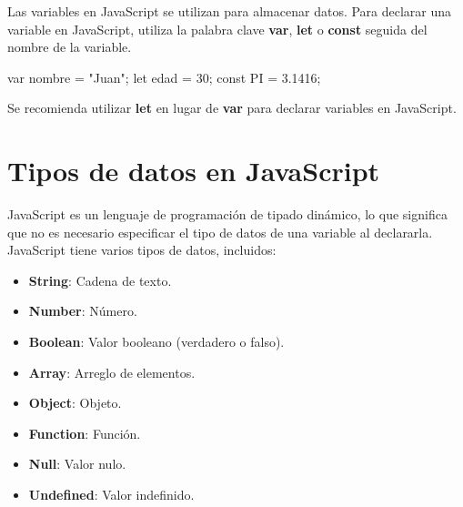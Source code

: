 \documentclass[
  a4paper,
  DIV=11,
  numbers=noendperiod,
  onepage,
  openany]{scrreprt}
\newenvironment{Shaded}{\begin{snugshade}}{\end{snugshade}}
\newcommand{\ConstantTok}[1]{\textcolor[rgb]{0.56,0.35,0.01}{#1}}
\newcommand{\DecValTok}[1]{\textcolor[rgb]{0.68,0.00,0.00}{#1}}
\newcommand{\FloatTok}[1]{\textcolor[rgb]{0.68,0.00,0.00}{#1}}
\newcommand{\KeywordTok}[1]{\textcolor[rgb]{0.00,0.23,0.31}{#1}}
\newcommand{\NormalTok}[1]{\textcolor[rgb]{0.00,0.23,0.31}{#1}}
\newcommand{\OperatorTok}[1]{\textcolor[rgb]{0.37,0.37,0.37}{#1}}
\newcommand{\StringTok}[1]{\textcolor[rgb]{0.13,0.47,0.30}{#1}}
\providecommand{\tightlist}{%
  \setlength{\itemsep}{0pt}\setlength{\parskip}{0pt}}\usepackage{longtable,booktabs,array}
\begin{document}
Las variables en JavaScript se utilizan para almacenar datos. Para
declarar una variable en JavaScript, utiliza la palabra clave
\textbf{var}, \textbf{let} o \textbf{const} seguida del nombre de la
variable.

\begin{Shaded}
\begin{Highlighting}[]
\KeywordTok{var}\NormalTok{ nombre }\OperatorTok{=} \StringTok{"Juan"}\OperatorTok{;}
\KeywordTok{let}\NormalTok{ edad }\OperatorTok{=} \DecValTok{30}\OperatorTok{;}
\KeywordTok{const} \ConstantTok{PI} \OperatorTok{=} \FloatTok{3.1416}\OperatorTok{;}
\end{Highlighting}
\end{Shaded}

\begin{tcolorbox}[enhanced jigsaw, title=\textcolor{quarto-callout-tip-color}{\faLightbulb}\hspace{0.5em}{Tip}, colback=white, rightrule=.15mm, opacityback=0, colframe=quarto-callout-tip-color-frame, titlerule=0mm, opacitybacktitle=0.6, breakable, coltitle=black, colbacktitle=quarto-callout-tip-color!10!white, bottomtitle=1mm, toptitle=1mm, left=2mm, arc=.35mm, toprule=.15mm, leftrule=.75mm, bottomrule=.15mm]

Se recomienda utilizar \textbf{let} en lugar de \textbf{var} para
declarar variables en JavaScript.

\end{tcolorbox}

\section{Tipos de datos en
JavaScript}\label{tipos-de-datos-en-javascript}

JavaScript es un lenguaje de programación de tipado dinámico, lo que
significa que no es necesario especificar el tipo de datos de una
variable al declararla. JavaScript tiene varios tipos de datos,
incluidos:

\begin{itemize}
\tightlist
\item
  \textbf{String}: Cadena de texto.
\item
  \textbf{Number}: Número.
\item
  \textbf{Boolean}: Valor booleano (verdadero o falso).
\item
  \textbf{Array}: Arreglo de elementos.
\item
  \textbf{Object}: Objeto.
\item
  \textbf{Function}: Función.
\item
  \textbf{Null}: Valor nulo.
\item
  \textbf{Undefined}: Valor indefinido.
\end{itemize}
\end{document}
